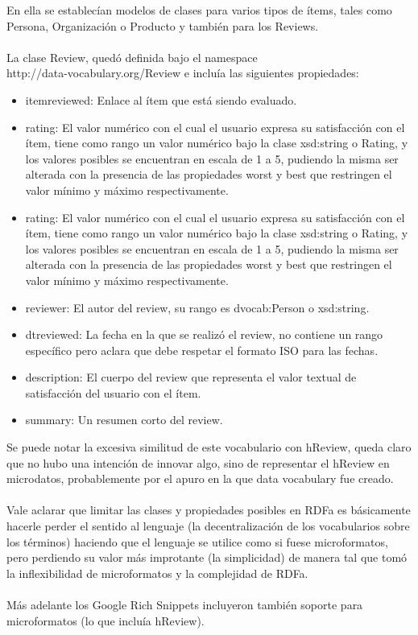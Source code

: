 En ella se establecían modelos de clases para varios tipos de ítems, tales como Persona, Organización o Producto y también para los Reviews.
\\\\
La clase Review, quedó definida bajo el namespace \\\noindent http://data-vocabulary.org/Review e incluía las siguientes propiedades:
\begin{itemize}
 \item itemreviewed: Enlace al ítem que está siendo evaluado.
 \item rating: El valor numérico con el cual el usuario expresa su satisfacción con el ítem, tiene como rango un valor numérico bajo la clase 
 xsd:string o Rating, y los valores posibles se encuentran en escala de 1 a 5, pudiendo la misma ser alterada con la presencia de las 
 propiedades worst y best que restringen el valor mínimo y máximo respectivamente.
 \item rating: El valor numérico con el cual el usuario expresa su satisfacción con el ítem, tiene como rango un valor numérico bajo la clase 
 xsd:string o Rating, y los valores posibles se encuentran en escala de 1 a 5, pudiendo la misma ser alterada con la presencia de las 
 propiedades worst y best que restringen el valor mínimo y máximo respectivamente.
 \item reviewer: El autor del review, su rango es dvocab:Person o xsd:string.
 \item dtreviewed: La fecha en la que se realizó el review, no contiene un rango específico pero aclara que debe respetar el formato 
 ISO para las fechas.
 \item description: El cuerpo del review que representa el valor textual de satisfacción del usuario con el ítem.
 \item summary: Un resumen corto del review.
\end{itemize}

Se puede notar la excesiva similitud de este vocabulario con hReview, queda claro que no hubo una intención de innovar algo, 
sino de representar el hReview en microdatos, probablemente por el apuro en la que data vocabulary fue creado.
\\\\
Vale aclarar que limitar las clases y propiedades posibles en RDFa es básicamente hacerle perder el sentido al lenguaje 
(la decentralización de los vocabularios sobre los términos) haciendo que el lenguaje se utilice como si fuese microformatos, 
pero perdiendo su valor más improtante (la simplicidad) de manera tal que tomó la inflexibilidad de microformatos y la complejidad 
de RDFa.
\\\\
Más adelante los Google Rich Snippets incluyeron también soporte para microformatos (lo que incluía hReview). 


